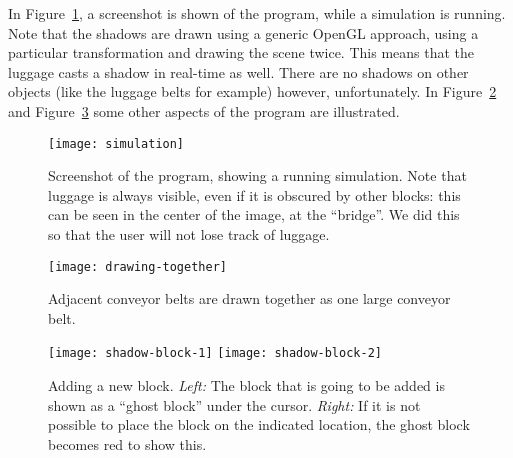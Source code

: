 In Figure~\ref{fig:simulation}, a screenshot is shown of the program, while a simulation is running. Note that the shadows are drawn using a generic OpenGL approach, using a particular transformation and drawing the scene twice. This means that the luggage casts a shadow in real-time as well. There are no shadows on other objects (like the luggage belts for example) however, unfortunately. In Figure~\ref{fig:drawing-together} and Figure~\ref{fig:shadow-block} some other aspects of the program are illustrated.

\begin{figure}
  \begin{center}
    \texttt{[image: simulation]}
    \caption{Screenshot of the program, showing a running simulation. Note that luggage is always visible, even if it is obscured by other blocks: this can be seen in the center of the image, at the ``bridge''. We did this so that the user will not lose track of luggage.}
    \label{fig:simulation}
  \end{center}
\end{figure}

\begin{figure}
  \begin{center}
    \texttt{[image: drawing-together]}
    \caption{Adjacent conveyor belts are drawn together as one large conveyor belt.}
    \label{fig:drawing-together}
  \end{center}
\end{figure}

\begin{figure}
  \begin{center}
    \texttt{[image: shadow-block-1]}
    \quad
    \texttt{[image: shadow-block-2]}
    \caption{Adding a new block. \textit{Left:} The block that is going to be added is shown as a ``ghost block'' under the cursor. \textit{Right:} If it is not possible to place the block on the indicated location, the ghost block becomes red to show this.}
    \label{fig:shadow-block}
  \end{center}
\end{figure}

